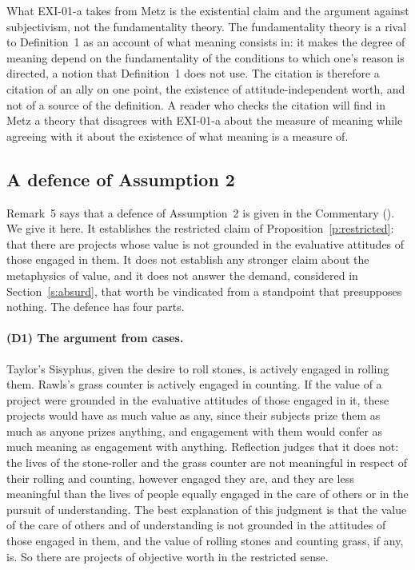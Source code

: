 What EXI-01-a takes from Metz is the existential claim and the argument against subjectivism, not the fundamentality theory. The fundamentality theory is a rival to Definition~1 as an account of what meaning consists in: it makes the degree of meaning depend on the fundamentality of the conditions to which one's reason is directed, a notion that Definition~1 does not use. The citation is therefore a citation of an ally on one point, the existence of attitude-independent worth, and not of a source of the definition. A reader who checks the citation will find in Metz a theory that disagrees with EXI-01-a about the measure of meaning while agreeing with it about the existence of what meaning is a measure of.

\subsection{A defence of Assumption 2}\label{s:defence}

Remark~5 says that a defence of Assumption~2 is given in the Commentary (). We give it here. It establishes the restricted claim of Proposition~\ref{p:restricted}: that there are projects whose value is not grounded in the evaluative attitudes of those engaged in them. It does not establish any stronger claim about the metaphysics of value, and it does not answer the demand, considered in Section~\ref{s:absurd}, that worth be vindicated from a standpoint that presupposes nothing. The defence has four parts.

\paragraph{(D1) The argument from cases.} Taylor's Sisyphus, given the desire to roll stones, is actively engaged in rolling them. Rawls's grass counter is actively engaged in counting. If the value of a project were grounded in the evaluative attitudes of those engaged in it, these projects would have as much value as any, since their subjects prize them as much as anyone prizes anything, and engagement with them would confer as much meaning as engagement with anything. Reflection judges that it does not: the lives of the stone-roller and the grass counter are not meaningful in respect of their rolling and counting, however engaged they are, and they are less meaningful than the lives of people equally engaged in the care of others or in the pursuit of understanding. The best explanation of this judgment is that the value of the care of others and of understanding is not grounded in the attitudes of those engaged in them, and the value of rolling stones and counting grass, if any, is. So there are projects of objective worth in the restricted sense.

